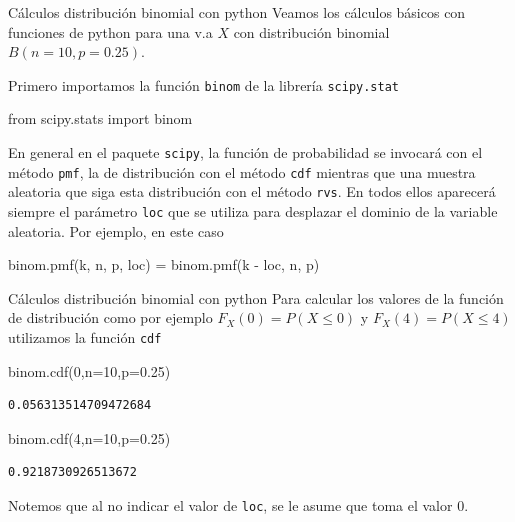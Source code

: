 \documentclass[
  ignorenonframetext,
  aspectratio=169]{beamer}
\newenvironment{Shaded}{\begin{snugshade}}{\end{snugshade}}
\newcommand{\DecValTok}[1]{\textcolor[rgb]{0.68,0.00,0.00}{#1}}
\newcommand{\FloatTok}[1]{\textcolor[rgb]{0.68,0.00,0.00}{#1}}
\newcommand{\ImportTok}[1]{\textcolor[rgb]{0.00,0.46,0.62}{#1}}
\newcommand{\NormalTok}[1]{\textcolor[rgb]{0.00,0.23,0.31}{#1}}
\newcommand{\OperatorTok}[1]{\textcolor[rgb]{0.37,0.37,0.37}{#1}}
\begin{document}
\begin{frame}[fragile]{Cálculos distribución binomial con python}
\protect\hypertarget{cuxe1lculos-distribuciuxf3n-binomial-con-python}{}
Veamos los cálculos básicos con funciones de python para una v.a \(X\)
con distribución binomial \(B(n=10,p=0.25)\).

Primero importamos la función \texttt{binom} de la librería
\texttt{scipy.stat}

\begin{Shaded}
\begin{Highlighting}[]
\ImportTok{from}\NormalTok{ scipy.stats }\ImportTok{import}\NormalTok{ binom}
\end{Highlighting}
\end{Shaded}

En general en el paquete \texttt{scipy}, la función de probabilidad se
invocará con el método \texttt{pmf}, la de distribución con el método
\texttt{cdf} mientras que una muestra aleatoria que siga esta
distribución con el método \texttt{rvs}. En todos ellos aparecerá
siempre el parámetro \texttt{loc} que se utiliza para desplazar el
dominio de la variable aleatoria. Por ejemplo, en este caso

\begin{Shaded}
\begin{Highlighting}[]
\NormalTok{binom.pmf(k, n, p, loc) }\OperatorTok{=}\NormalTok{  binom.pmf(k }\OperatorTok{{-}}\NormalTok{ loc, n, p)}
\end{Highlighting}
\end{Shaded}
\end{frame}

\begin{frame}[fragile]{Cálculos distribución binomial con python}
\protect\hypertarget{cuxe1lculos-distribuciuxf3n-binomial-con-python-1}{}
Para calcular los valores de la función de distribución como por ejemplo
\(F_X(0)=P(X\leq 0)\) y \(F_X(4)=P(X\leq 4)\) utilizamos la función
\texttt{cdf}

\begin{Shaded}
\begin{Highlighting}[]
\NormalTok{binom.cdf(}\DecValTok{0}\NormalTok{,n}\OperatorTok{=}\DecValTok{10}\NormalTok{,p}\OperatorTok{=}\FloatTok{0.25}\NormalTok{)}
\end{Highlighting}
\end{Shaded}

\begin{verbatim}
0.056313514709472684
\end{verbatim}

\begin{Shaded}
\begin{Highlighting}[]
\NormalTok{binom.cdf(}\DecValTok{4}\NormalTok{,n}\OperatorTok{=}\DecValTok{10}\NormalTok{,p}\OperatorTok{=}\FloatTok{0.25}\NormalTok{)}
\end{Highlighting}
\end{Shaded}

\begin{verbatim}
0.9218730926513672
\end{verbatim}

Notemos que al no indicar el valor de \texttt{loc}, se le asume que toma
el valor 0.
\end{frame}
\end{document}
